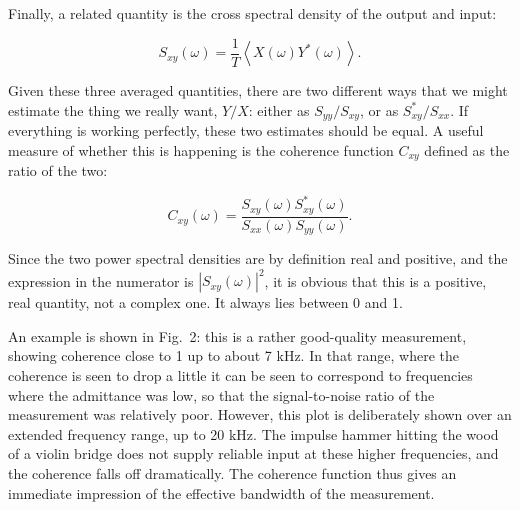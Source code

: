   Finally, a related quantity is the cross spectral density of the output and 
  input: 

  \begin{equation*}S_{xy}(\omega) = \frac{1}{T}\left<X(\omega) 
  Y^*(\omega)\right> .\tag{3}\end{equation*} 

  Given these three averaged quantities, there are two different ways that we 
  might estimate the thing we really want, $Y/X$: either as $S_{yy}/S_{xy}$, or 
  as $S^*_{xy}/S_{xx}$. If everything is working perfectly, these two estimates 
  should be equal. A useful measure of whether this is happening is the 
  coherence function $C_{xy}$ defined as the ratio of the two: 

  
  \begin{equation*}C_{xy}(\omega)=\dfrac{S_{xy}(\omega)S^*_{xy}(\omega)}{S_{xx}(\omega) 
  S_{yy}(\omega)} .\tag{4}\end{equation*} 

  Since the two power spectral densities are by definition real and positive, 
  and the expression in the numerator is $|S_{xy}(\omega)|^2$, it is obvious 
  that this is a positive, real quantity, not a complex one. It always lies 
  between 0 and 1. 

  An example is shown in Fig.\ 2: this is a rather good-quality measurement, 
  showing coherence close to 1 up to about 7 kHz. In that range, where the 
  coherence is seen to drop a little it can be seen to correspond to 
  frequencies where the admittance was low, so that the signal-to-noise ratio 
  of the measurement was relatively poor. However, this plot is deliberately 
  shown over an extended frequency range, up to 20 kHz. The impulse hammer 
  hitting the wood of a violin bridge does not supply reliable input at these 
  higher frequencies, and the coherence falls off dramatically. The coherence 
  function thus gives an immediate impression of the effective bandwidth of the 
  measurement. 

